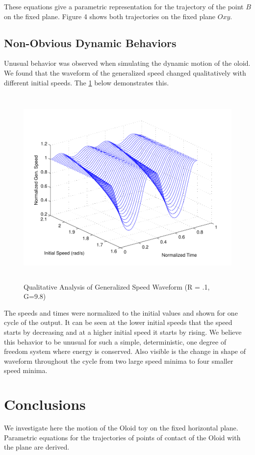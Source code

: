 \documentclass[10pt]{enoc2011}
\begin{document}
These equations give a parametric representation for the trajectory of the point $B$ on the fixed plane. Figure 4 shows both trajectories on the fixed plane $Oxy$.

\subsection*{Non-Obvious Dynamic Behaviors}
Unusual behavior was observed when simulating the dynamic motion of the oloid.  We found that the waveform of the generalized speed changed qualitatively with different initial speeds.  The \ref{waveform} below demonstrates this. 
\begin{figure}[h!]
  \label{waveform}
  \centering\includegraphics[height=10cm]{Waveform}
\caption{Qualitative Analysis of Generalized Speed Waveform (R = .1, G=9.8)}
\end{figure}
The speeds and times were normalized to the initial values and shown for one cycle of the output.  It can be seen at the lower initial speeds that the speed starts by decreasing and at a higher initial speed it starts by rising.  We believe this behavior to be unusual for such a simple, deterministic, one degree of freedom system where energy is conserved.  Also visible is the change in shape of waveform throughout the cycle from two large speed minima to four smaller speed minima.  


\section*{Conclusions}
We investigate here the motion of the Oloid toy on the fixed horizontal plane. Parametric equations for the trajectories of points of contact of the Oloid with the plane are derived.
\end{document}

